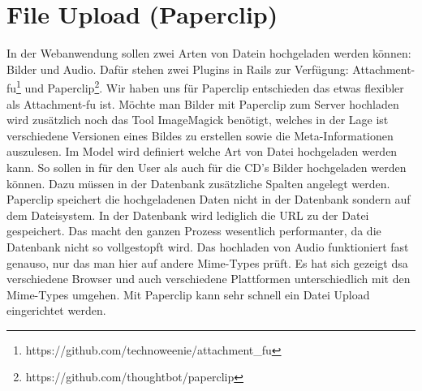 \section{File Upload (Paperclip)}
In der Webanwendung sollen zwei Arten von Datein hochgeladen werden können: Bilder und Audio. Dafür stehen zwei Plugins in Rails zur Verfügung: Attachment-fu\footnote{https://github.com/technoweenie/attachment_fu} und Paperclip\footnote{https://github.com/thoughtbot/paperclip}. Wir haben uns für Paperclip entschieden das etwas flexibler als Attachment-fu ist. Möchte man Bilder mit Paperclip zum Server hochladen wird zusätzlich noch das Tool ImageMagick benötigt, welches in der Lage ist verschiedene Versionen eines Bildes zu erstellen sowie die Meta-Informationen auszulesen. Im Model wird definiert welche Art von Datei hochgeladen werden kann. So sollen in für den User als auch für die CD's Bilder hochgeladen werden können. Dazu müssen in der Datenbank zusätzliche Spalten angelegt werden. Paperclip speichert die hochgeladenen Daten nicht in der Datenbank sondern auf dem Dateisystem. In der Datenbank wird lediglich die URL zu der Datei gespeichert. Das macht den ganzen Prozess wesentlich performanter, da die Datenbank nicht so vollgestopft wird. Das hochladen von Audio funktioniert fast genauso, nur das man hier auf andere Mime-Types prüft. Es hat sich gezeigt dsa verschiedene Browser und auch verschiedene Plattformen unterschiedlich mit den Mime-Types umgehen. Mit Paperclip kann sehr schnell ein Datei Upload eingerichtet werden.